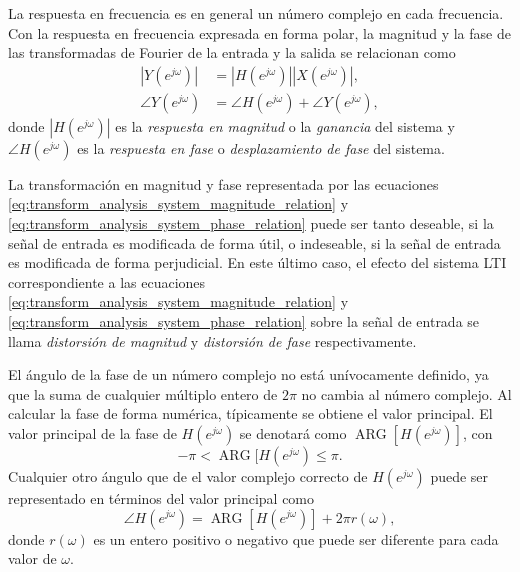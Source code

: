 \documentclass[a4paper]{report}
\DeclareMathOperator{\ARG}{ARG}
\begin{document}
La respuesta en frecuencia es en general un número complejo en cada frecuencia. Con la respuesta en frecuencia expresada en forma polar, la magnitud y la fase de las transformadas de Fourier de la entrada y la salida se relacionan como
\begin{align}
 |Y(e^{j\omega})|&=|H(e^{j\omega})||X(e^{j\omega})|,\label{eq:transform_analysis_system_magnitude_relation}\\
 \angle Y(e^{j\omega})&=\angle H(e^{j\omega})+\angle Y(e^{j\omega}),\label{eq:transform_analysis_system_phase_relation}
\end{align}
donde \(|H(e^{j\omega})|\) es la \emph{respuesta en magnitud} o la \emph{ganancia} del sistema y \(\angle H(e^{j\omega})\) es la \emph{respuesta en fase} o \emph{desplazamiento de fase} del sistema.

La transformación en magnitud y fase representada por las ecuaciones  \ref{eq:transform_analysis_system_magnitude_relation} y \ref{eq:transform_analysis_system_phase_relation} puede ser tanto deseable, si la señal de entrada es modificada de forma útil, o indeseable, si la señal de entrada es modificada de forma perjudicial. En este último caso, el efecto del sistema LTI correspondiente a las ecuaciones  \ref{eq:transform_analysis_system_magnitude_relation} y \ref{eq:transform_analysis_system_phase_relation} sobre la señal de entrada se llama \emph{distorsión de magnitud} y \emph{distorsión de fase} respectivamente.

El ángulo de la fase de un número complejo no está unívocamente definido, ya que la suma de cualquier múltiplo entero de \(2\pi\) no cambia al número complejo. Al calcular la fase de forma numérica, típicamente se obtiene el valor principal. El valor principal de la fase de \(H(e^{j\omega})\) se denotará como \(\ARG[H(e^{j\omega})]\), con 
\[
 -\pi<\ARG[H(e^{j\omega})\leq\pi.
\]
Cualquier otro ángulo que de el valor complejo correcto de \(H(e^{j\omega})\) puede ser representado en términos del valor principal como
\[
 \angle H(e^{j\omega})=\ARG[H(e^{j\omega})]+2\pi r(\omega),
\]
donde \(r(\omega)\) es un entero positivo o negativo que puede ser diferente para cada valor de \(\omega\). 
\end{document}
